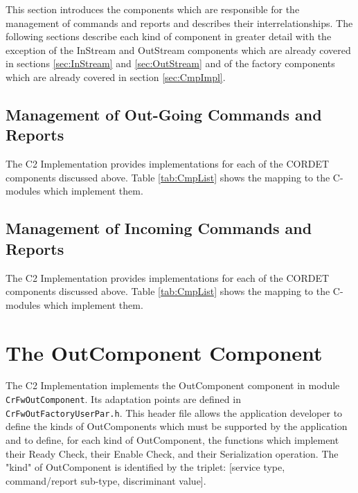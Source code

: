 \documentclass{pnp_article}
\begin{document}
This section introduces the components which are responsible for the management of commands and reports and describes their interrelationships. The following sections describe each kind of component in greater detail with the exception of the InStream and OutStream components which are already covered in sections \ref{sec:InStream} and \ref{sec:OutStream} and of the factory components which are already covered in section \ref{sec:CmpImpl}.

\subsection{Management of Out-Going Commands and Reports}\label{sec:ManagementOfOutGoingCmdAndRep}


The C2 Implementation provides implementations for each of the CORDET components discussed above. Table \ref{tab:CmpList} shows the mapping to the C-modules which implement them.

\subsection{Management of Incoming Commands and Reports}\label{sec:ManagementOfIncomingCmdAndRep}


The C2 Implementation provides implementations for each of the CORDET components discussed above. Table \ref{tab:CmpList} shows the mapping to the C-modules which implement them.


\section{The OutComponent Component}\label{sec:OutComponent}
 

The C2 Implementation implements the OutComponent component in module \texttt{CrFwOutComponent}. Its adaptation points are defined in \texttt{CrFwOutFactoryUserPar.h}. This header file allows the application developer to define the kinds of OutComponents which must be supported by the application and to define, for each kind of OutComponent, the functions which implement their Ready Check, their Enable Check, and their Serialization operation. The "kind" of OutComponent is identified by the triplet: [service type, command/report sub-type, discriminant value]. 
\end{document}
